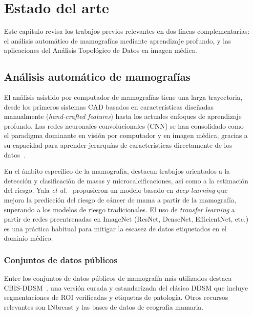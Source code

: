 \chapter{Estado del arte}
\label{cap:estado-arte}

Este capítulo revisa los trabajos previos relevantes en dos líneas
complementarias: el análisis automático de mamografías mediante aprendizaje
profundo, y las aplicaciones del Análisis Topológico de Datos en imagen médica.

\section{Análisis automático de mamografías}
El análisis asistido por computador de mamografías tiene una larga trayectoria,
desde los primeros sistemas CAD basados en características diseñadas manualmente
(\textit{hand-crafted features}) hasta los actuales enfoques de aprendizaje
profundo. Las redes neuronales convolucionales (CNN) se han consolidado como el
paradigma dominante en visión por computador y en imagen médica, gracias a su
capacidad para aprender jerarquías de características directamente de los
datos~\cite{litjens2017survey, alieli2024survey}.

En el ámbito específico de la mamografía, destacan trabajos orientados a la
detección y clasificación de masas y microcalcificaciones, así como a la
estimación del riesgo. Yala \textit{et al.}~\cite{yala2019} propusieron un
modelo basado en \textit{deep learning} que mejora la predicción del riesgo de
cáncer de mama a partir de la mamografía, superando a los modelos de riesgo
tradicionales. El uso de \textit{transfer learning} a partir de redes
preentrenadas en ImageNet (ResNet, DenseNet, EfficientNet, etc.) es una práctica
habitual para mitigar la escasez de datos etiquetados en el dominio médico.

\subsection{Conjuntos de datos públicos}
Entre los conjuntos de datos públicos de mamografía más utilizados destaca
\mbox{CBIS-DDSM}~\cite{lee2017cbisddsm}, una versión curada y estandarizada del
clásico DDSM que incluye segmentaciones de ROI verificadas y etiquetas de
patología. Otros recursos relevantes son INbreast y las bases de datos de
ecografía mamaria.

